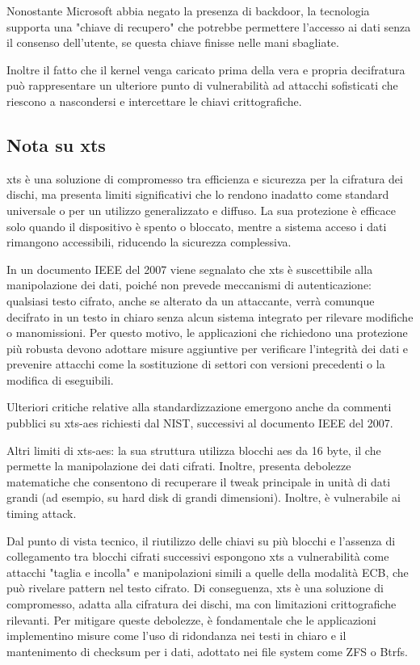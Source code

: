 Nonostante Microsoft abbia negato la presenza di backdoor, la tecnologia supporta una "chiave di recupero" che potrebbe permettere l'accesso ai dati senza il consenso dell'utente, se questa chiave finisse nelle mani sbagliate.

Inoltre il fatto che il kernel venga caricato prima della vera e propria decifratura può rappresentare un ulteriore punto di vulnerabilità ad attacchi sofisticati che riescono a nascondersi e intercettare le chiavi crittografiche.

\subsection{Nota su \texorpdfstring{\acrshort{xts}}{XTS}}\label{subsec:nota_su_xts}

\acrshort{xts} è una soluzione di compromesso tra efficienza e sicurezza per la cifratura dei dischi, ma presenta limiti significativi che lo rendono inadatto come standard universale o per un utilizzo generalizzato e diffuso. La sua protezione è efficace solo quando il dispositivo è spento o bloccato, mentre a sistema acceso i dati rimangono accessibili, riducendo la sicurezza complessiva.

In un documento IEEE del 2007 viene segnalato che \acrshort{xts} è suscettibile alla manipolazione dei dati, poiché non prevede meccanismi di autenticazione: qualsiasi testo cifrato, anche se alterato da un attaccante, verrà comunque decifrato in un testo in chiaro senza alcun sistema integrato per rilevare modifiche o manomissioni. Per questo motivo, le applicazioni che richiedono una protezione più robusta devono adottare misure aggiuntive per verificare l’integrità dei dati e prevenire attacchi come la sostituzione di settori con versioni precedenti o la modifica di eseguibili.

Ulteriori critiche relative alla standardizzazione emergono anche da commenti pubblici su \acrshort{xts}-\acrshort{aes} richiesti dal NIST, successivi al documento IEEE del 2007.

Altri limiti di \acrshort{xts}-\acrshort{aes}: la sua struttura utilizza blocchi \acrshort{aes} da 16 byte, il che permette la manipolazione dei dati cifrati. Inoltre, presenta debolezze matematiche che consentono di recuperare il tweak principale in unità di dati grandi (ad esempio, su hard disk di grandi dimensioni). Inoltre, è vulnerabile ai timing attack.

Dal punto di vista tecnico, il riutilizzo delle chiavi su più blocchi e l'assenza di collegamento tra blocchi cifrati successivi espongono \acrshort{xts} a vulnerabilità come attacchi "taglia e incolla" e manipolazioni simili a quelle della modalità ECB, che può rivelare pattern nel testo cifrato. Di conseguenza, \acrshort{xts} è una soluzione di compromesso, adatta alla cifratura dei dischi, ma con limitazioni crittografiche rilevanti. Per mitigare queste debolezze, è fondamentale che le applicazioni implementino misure come l'uso di ridondanza nei testi in chiaro e il mantenimento di checksum per i dati, adottato nei file system come ZFS o Btrfs.


